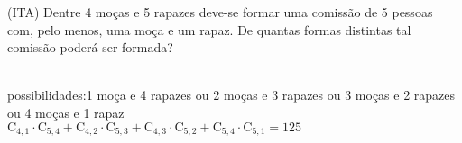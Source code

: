 \begin{ex}
  (ITA) Dentre 4 moças e 5 rapazes deve-se formar uma comissão de 5 pessoas com, pelo menos, uma moça e um rapaz. De quantas formas distintas tal comissão poderá ser formada?
   \begin{sol}
       \phantom{A} \\
   possibilidades:1 moça e 4 rapazes ou 2 moças e 3 rapazes ou 3 moças e 2 rapazes ou 4 moças e 1 rapaz\\
   $ \mathrm{C}_{4,1}\cdot \mathrm{C}_{5,4} + \mathrm{C}_{4,2}\cdot \mathrm{C}_{5,3} + \mathrm{C}_{4,3}\cdot \mathrm{C}_{5,2} + \mathrm{C}_{5,4} \cdot \mathrm{C}_{5,1} = 125$
    \end{sol}
\end{ex}
